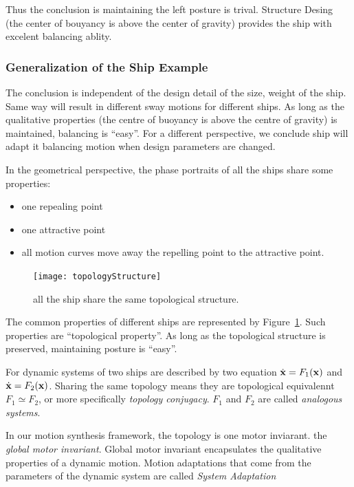 Thus  the conclusion is  maintaining the left posture is trival. 
Structure Desing (the center of bouyancy is above the center of gravity) provides the ship with excelent balancing ablity.


\subsubsection*{Generalization of the Ship Example} 
The conclusion is independent of the design detail of the size, weight of the ship. 
Same way will result in different sway motions for different ships.
As long as the qualitative properties (the centre of buoyancy is above the centre of gravity) is maintained, balancing is ``easy''.
For a different perspective,   we conclude ship will adapt it balancing motion when design parameters are changed.


In the geometrical perspective, the phase portraits of all the ships share some properties:
\begin{itemize}
\item one repealing point 
\item one attractive point 
\item all motion curves move away the repelling point to the attractive point. 
\end{itemize}


\begin{figure}[!htbp]
  \begin{center}
   \texttt{[image: topologyStructure]}
   \caption{all the ship share the same topological structure.}
   \label{fig:topologyStructure}
  \end{center}
\end{figure}

The common properties of different ships are represented by Figure~\ref{fig:topologyStructure}.
Such properties are “topological property”.
As long as the topological structure is preserved, maintaining posture is ``easy''.

For dynamic systems of two ships are described by two equation $\dot{\mathbf{x}}=F_1(\mathbf{x})$ and $\dot{\mathbf{x}}=F_2(\mathbf{x})$.
Sharing the same topology means they are topological equivalennt $F_1 \simeq F_2$, or more specifically \emph{topology conjugacy}.
$F_1$ and $F_2$ are called \emph{analogous systems}.


In our motion synthesis framework, the topology is one motor inviarant. the \emph{global motor invariant}.
Global motor invariant encapsulates the qualitative properties of a dynamic motion.
Motion adaptations that come from the parameters of the dynamic system are called \emph{System Adaptation}


